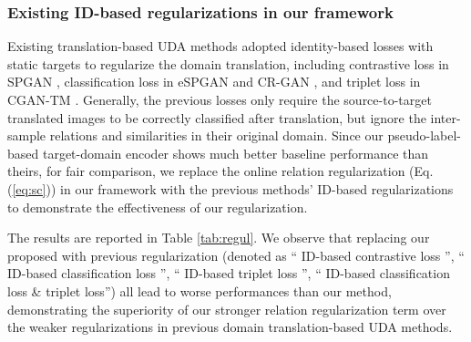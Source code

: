 \documentclass[journal]{IEEEtran}
\begin{document}
\subsubsection{\textbf{Existing ID-based regularizations in our framework}}
\label{sec:com_dt_2}
Existing translation-based UDA methods \cite{deng2018image,wei2018person,deng2018similarity,chen2019instance} adopted identity-based losses with static targets to regularize the domain translation, including contrastive loss in SPGAN \cite{deng2018image}, classification loss in eSPGAN \cite{deng2018similarity} and CR-GAN \cite{chen2019instance}, and triplet loss in CGAN-TM \cite{tang2020cgan}. Generally, the previous losses only require the source-to-target translated images to be correctly classified after translation,  {but ignore the inter-sample relations and similarities in their original domain}.
Since our pseudo-label-based target-domain encoder shows much better baseline performance than theirs,
for fair comparison,
we replace the online relation regularization  (Eq. (\ref{eq:sc})) in our framework with the previous methods' ID-based regularizations to demonstrate the effectiveness of our regularization.

The results are reported in Table \ref{tab:regul}.
We observe that replacing our proposed  with previous regularization (denoted as `` ID-based contrastive loss \cite{deng2018image}'', `` ID-based classification loss  \cite{deng2018similarity,chen2019instance,zou2020joint}'',
`` ID-based triplet loss \cite{tang2020cgan}'',  {`` ID-based classification loss \& triplet loss''}) all lead to worse performances than our method, demonstrating the superiority of our stronger relation regularization term over the weaker regularizations in previous domain translation-based UDA methods.
\end{document}
